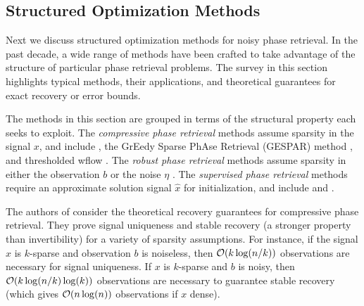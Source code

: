 \subsection{Structured Optimization Methods}  	\label{Subsubsec:phase_retrieval-structured}


Next we discuss structured optimization methods for noisy phase retrieval.  In the past decade, a wide range of methods have been crafted to take advantage of the structure of particular phase retrieval problems.  The survey in this section highlights typical methods, their applications, and theoretical guarantees for exact recovery or error bounds.  


The methods in this section are grouped in terms of the structural property each seeks to exploit.  
The \textit{compressive phase retrieval} methods assume sparsity in the signal $x$, and include \cite{DBLP:journals/corr/abs-1104-4406}, the GrEedy Sparse PhAse Retrieval (GESPAR) method \cite{shechtman2014gespar}, and thresholded wflow  \cite{cai2016optimal}.
The \textit{robust phase retrieval} methods assume sparsity in either the observation $b$ \cite{katkovnik2017phase} or the noise $\eta$ \cite{jiang2017robust}.
The \textit{supervised phase retrieval} methods require an approximate solution signal $\hat{x}$ for initialization, and include \cite{goldstein2018phasemax} and \cite{bahmani2016phase}.



The authors of \cite{DBLP:journals/corr/abs-1211-0872} consider the theoretical recovery guarantees for compressive phase retrieval.
They prove signal uniqueness and stable recovery (a stronger property than invertibility) for a variety of sparsity assumptions.  
For instance, if the signal $x$ is $k$-sparse and observation $b$ is noiseless, then ${\mathcal O}(k \log(n/k))$ observations are necessary for signal uniqueness.  
If $x$ is $k$-sparse and $b$ is noisy, then ${\mathcal O}(k \log(n/k) \log(k))$ observations are necessary to guarantee stable recovery (which gives ${\mathcal O}(n \log(n))$ observations if $x$ dense).


